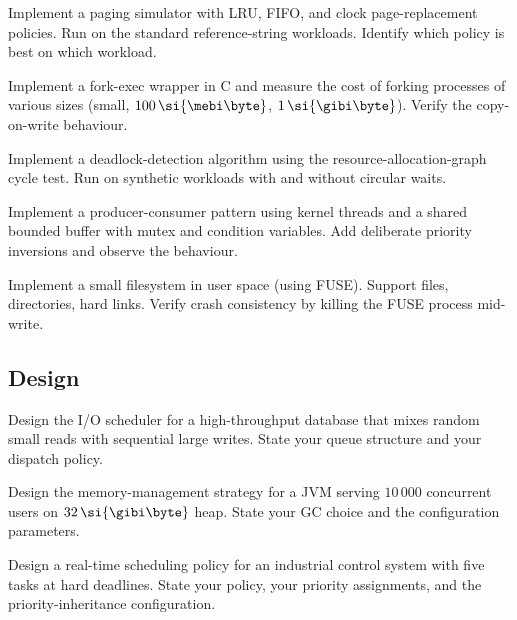 \begin{exercise}
Implement a paging simulator with LRU, FIFO, and clock page-replacement policies. Run on the standard reference-string workloads. Identify which policy is best on which workload.
\end{exercise}

\begin{exercise}
Implement a fork-exec wrapper in C and measure the cost of forking processes of various sizes (small, $100\,\si{\mebi\byte}$, $1\,\si{\gibi\byte}$). Verify the copy-on-write behaviour.
\end{exercise}

\begin{exercise}
Implement a deadlock-detection algorithm using the resource-allocation-graph cycle test. Run on synthetic workloads with and without circular waits.
\end{exercise}

\begin{exercise}
Implement a producer-consumer pattern using kernel threads and a shared bounded buffer with mutex and condition variables. Add deliberate priority inversions and observe the behaviour.
\end{exercise}

\begin{exercise}
Implement a small filesystem in user space (using FUSE). Support files, directories, hard links. Verify crash consistency by killing the FUSE process mid-write.
\end{exercise}

\subsection*{Design}

\begin{exercise}
Design the I/O scheduler for a high-throughput database that mixes random small reads with sequential large writes. State your queue structure and your dispatch policy.
\end{exercise}

\begin{exercise}
Design the memory-management strategy for a JVM serving $10\,000$ concurrent users on $32\,\si{\gibi\byte}$ heap. State your GC choice and the configuration parameters.
\end{exercise}

\begin{exercise}
Design a real-time scheduling policy for an industrial control system with five tasks at hard deadlines. State your policy, your priority assignments, and the priority-inheritance configuration.
\end{exercise}

